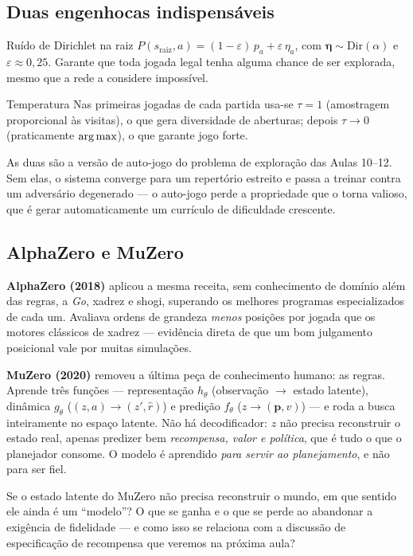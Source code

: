 \documentclass[a4paper, 11pt]{article}
\newcommand{\raiz}{s_{\mathrm{raiz}}}
\begin{document}
\subsection{Duas engenhocas indispensáveis}

\begin{defbox}{Ruído de Dirichlet na raiz}
$P(\raiz,a) = (1-\varepsilon)\,p_a + \varepsilon\,\eta_a$, com
$\bm{\eta}\sim\mathrm{Dir}(\alpha)$ e $\varepsilon\approx0{,}25$. Garante que
toda jogada legal tenha alguma chance de ser explorada, mesmo que a rede a
considere impossível.
\end{defbox}

\begin{defbox}{Temperatura}
Nas primeiras jogadas de cada partida usa-se $\tau=1$ (amostragem proporcional
às visitas), o que gera diversidade de aberturas; depois $\tau\to0$
(praticamente $\operatorname*{arg\,max}$), o que garante jogo forte.
\end{defbox}

As duas são a versão de auto-jogo do problema de exploração das Aulas 10--12.
Sem elas, o sistema converge para um repertório estreito e passa a treinar
contra um adversário degenerado --- o auto-jogo perde a propriedade que o torna
valioso, que é gerar automaticamente um currículo de dificuldade crescente.

\subsection{AlphaZero e MuZero}

\textbf{AlphaZero (2018)} aplicou a mesma receita, sem conhecimento de domínio
além das regras, a \emph{Go}, xadrez e shogi, superando os melhores programas
especializados de cada um. Avaliava ordens de grandeza \emph{menos} posições por
jogada que os motores clássicos de xadrez --- evidência direta de que um bom
julgamento posicional vale por muitas simulações.

\textbf{MuZero (2020)} removeu a última peça de conhecimento humano: as regras.
Aprende três funções --- representação $h_\theta$ (observação $\to$ estado
latente), dinâmica $g_\theta$ ($(z,a)\to(z',\hat r)$) e predição $f_\theta$
($z\to(\bm{p},v)$) --- e roda a busca inteiramente no espaço latente. Não há
decodificador: $z$ não precisa reconstruir o estado real, apenas predizer bem
\emph{recompensa, valor e política}, que é tudo o que o planejador consome. O
modelo é aprendido \emph{para servir ao planejamento}, e não para ser fiel.

\begin{discbox}
Se o estado latente do MuZero não precisa reconstruir o mundo, em que sentido
ele ainda é um ``modelo''? O que se ganha e o que se perde ao abandonar a
exigência de fidelidade --- e como isso se relaciona com a discussão de
especificação de recompensa que veremos na próxima aula?
\end{discbox}
\end{document}
